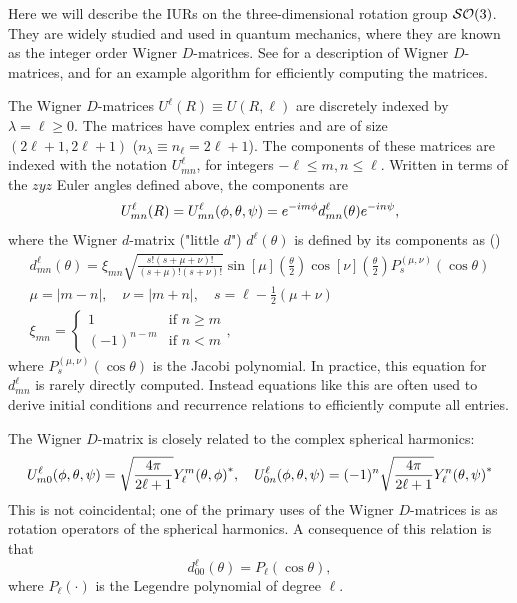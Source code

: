 \documentclass[../../main.tex]{subfiles}
\begin{document}
\begin{refsection}
	Here we will describe the IURs on the three-dimensional rotation group $\mathcal{SO} (3)$.
	They are widely studied and used in quantum mechanics, where they are known as the integer order Wigner $D$-matrices.
	See \cite{wignerThreeDimensionalPureRotation1959,varshalovichQuantumTheoryAngular1988} for a description of Wigner $D$-matrices, and \cite{choiRapidStableDetermination1999} for an example algorithm for efficiently computing the matrices.

	The Wigner $D$-matrices $U^\ell(R) \equiv U(R, \ell)$ are discretely indexed by $\lambda = \ell \ge 0$.
	The matrices have complex entries and are of size $(2\ell + 1, 2\ell + 1)$ (\ie $n_\lambda \equiv n_\ell = 2\ell + 1$).
	The components of these matrices are indexed with the notation $U^\ell_{mn}$, for integers $-\ell \le m,n \le \ell$.
	Written in terms of the $zyz$ Euler angles defined above, the components are
	\begin{equation}\label{wignerd}
		U^\ell_{mn}(R) = U^\ell_{mn}(\phi, \theta, \psi) = e^{-i m \phi} d^\ell_{mn}(\theta) e^{-i n \psi},
	\end{equation}
	where the Wigner $d$-matrix ("little $d$") $d^\ell(\theta)$ is defined by its components as (\cite[Eq. 4.3.4.13]{varshalovichQuantumTheoryAngular1988})
	\begin{equation}
		\begin{split}
			d^\ell_{mn}(\theta) = \xi_{mn} \sqrt{\frac{s! (s+\mu+\nu)!}{(s+\mu)! (s+\nu)!}} \sin[\mu](\frac{\theta}{2}) \cos[\nu](\frac{\theta}{2}) P_s^{(\mu,\nu)}(\cos\theta) \\
			\mu=|m-n|, \quad \nu=|m+n|, \quad s=\ell - \frac{1}{2}(\mu + \nu) \\
			\xi_{mn} =
			\begin{cases}
				1          & \text{if $n \ge m$} \\
				(-1)^{n-m} & \text{if $n < m$}
			\end{cases},
		\end{split}
	\end{equation}
	where $P_s^{(\mu,\nu)}(\cos\theta)$ is the Jacobi polynomial.
	In practice, this equation for $d^\ell_{mn}$ is rarely directly computed.
	Instead equations like this are often used to derive initial conditions and recurrence relations to efficiently compute all entries\supercite{choiRapidStableDetermination1999}.

	The Wigner $D$-matrix is closely related to the complex spherical harmonics:
	\begin{equation}\label{wignerd_spher_harmon}
		U^\ell_{m0}(\phi, \theta, \psi) = \sqrt{\frac{4\pi}{2\ell + 1}} {Y^m_\ell(\theta, \phi)}^*, \quad U^\ell_{0n}(\phi, \theta, \psi) = (-1)^n \sqrt{\frac{4\pi}{2\ell + 1}} {Y^n_\ell(\theta, \psi)}^*
	\end{equation}
	This is not coincidental; one of the primary uses of the Wigner $D$-matrices is as rotation operators of the spherical harmonics.
	A consequence of this relation is that
	$$d^\ell_{00}(\theta) = P_\ell(\cos\theta),$$
	where $P_\ell(\cdot)$ is the Legendre polynomial of degree $\ell$.


\end{refsection}
\end{document}
